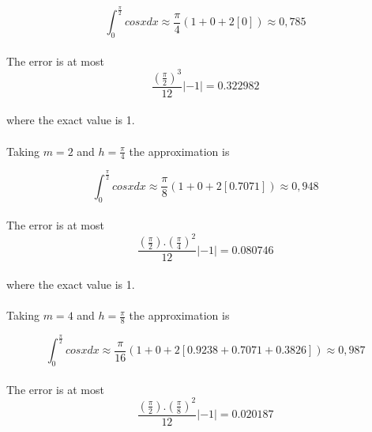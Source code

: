 \documentclass[11pt]{article}
\begin{document}
\begin{equation*}
\int_{0}^{\frac{\pi}{2}} cosx dx \approx \frac{\pi}{4} (1 + 0 + 2[0] ) \approx 0,785
\end{equation*}
\paragraph{} The error is at most
\begin{equation*}
\frac{(\frac{\pi}{2})^3}{12} \left|-1\right| = 0.322982
\end{equation*}
\paragraph{} where the exact value is 1.

\paragraph{} Taking $m=2$ and $h= \frac{\pi}{4}$ the approximation is 

\begin{equation*}
\int_{0}^{\frac{\pi}{2}} cosx dx \approx \frac{\pi}{8} (1 + 0 + 2[0.7071] ) \approx 0,948
\end{equation*}
\paragraph{} The error is at most
\begin{equation*}
\frac{(\frac{\pi}{2}).(\frac{\pi}{4})^2}{12} \left|-1\right| = 0.080746
\end{equation*}
\paragraph{} where the exact value is 1.

\paragraph{} Taking $m=4$ and $h= \frac{\pi}{8}$ the approximation is 

\begin{equation*}
\int_{0}^{\frac{\pi}{2}} cosx dx \approx \frac{\pi}{16} (1 + 0 + 2[0.9238 + 0.7071 + 0.3826] ) \approx 0,987
\end{equation*}
\paragraph{} The error is at most
\begin{equation*}
\frac{(\frac{\pi}{2}).(\frac{\pi}{8})^2}{12} \left|-1\right| = 0.020187
\end{equation*}
\end{document}

